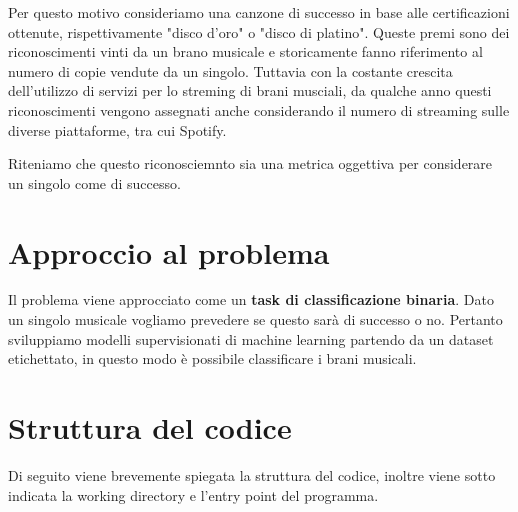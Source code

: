 Per questo motivo consideriamo una canzone di successo in base alle
certificazioni ottenute, rispettivamente "disco d'oro" o "disco di
platino". Queste premi sono dei riconoscimenti vinti da un brano
musicale e storicamente fanno riferimento al numero di copie vendute
da un singolo. Tuttavia con la costante crescita dell'utilizzo di
servizi per lo streming di brani musciali, da qualche anno questi
riconoscimenti vengono assegnati anche considerando il numero di
streaming sulle diverse piattaforme, tra cui Spotify.

Riteniamo che questo riconosciemnto sia una metrica oggettiva per
considerare un singolo come di successo.

\section{Approccio al problema}
Il problema viene approcciato come un \textbf{task di classificazione
  binaria}. Dato un singolo musicale vogliamo prevedere se questo sarà
di successo o no. Pertanto sviluppiamo modelli supervisionati di
machine learning partendo da un dataset etichettato, in questo modo è
possibile classificare i brani musicali.


\section{Struttura del codice}
Di seguito viene brevemente spiegata la struttura del codice, inoltre
viene sotto indicata la working directory e l'entry point del
programma.



